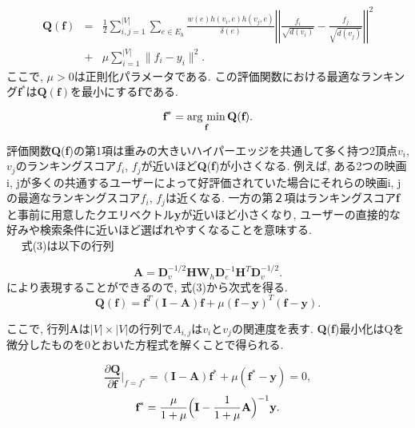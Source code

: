 \documentclass[a4j,11pt]{jarticle}           %
\newcommand{\argmin}{\mathop{\rm arg~min}\limits}
\begin{document}
	\begin{eqnarray}
		\textbf{Q}(\textbf{f})&=&\frac{1}{2}\sum_{i, j=1}^{|V|}\sum_{e\in E_h}\frac{w(e)h(v_i, e)h(v_j, e)}{\delta(e)}\left|\left|\frac{f_i}{\sqrt{d(v_i)}} - \frac{f_j}{\sqrt{d(v_j)}}\right|\right|^2 \nonumber \\ &+& \mu\sum_{i=1}^{|V|}\|f_i-y_i\|^2.
	\end{eqnarray}
	ここで, $\mu>0$は正則化パラメータである. この評価関数における最適なランキング$\textbf{f}^*$は$\textbf{Q}(\textbf{f})$を最小にする\textbf{f}である. 
	
	\begin{equation}
		\textbf{f}^* = \argmin_{\textbf{f}} \textbf{Q}(\textbf{f}). 
	\end{equation}
	
	評価関数\textbf{Q}(\textbf{f})の第1項は重みの大きいハイパーエッジを共通して多く持つ2頂点$v_i$, $v_j$のランキングスコア$f_i$, $f_j$が近いほど\textbf{Q}(\textbf{f})が小さくなる. 
	例えば, ある2つの映画i, jが多くの共通するユーザーによって好評価されていた場合にそれらの映画i, jの最適なランキングスコア$f_i$, $f_j$は近くなる. 
	一方の第２項はランキングスコア\textbf{f}と事前に用意したクエリベクトル\textbf{y}が近いほど小さくなり, ユーザーの直接的な好みや検索条件に近いほど選ばれやすくなることを意味する. 
	\\　 式(3)は以下の行列
	
	\begin{equation}
		\textbf{A}= \textbf{D}_v^{-1/2}\textbf{H}\textbf{W}_h\textbf{D}_e^{-1}\textbf{H}^T\textbf{D}_v^{-1/2}.
	\end{equation}
	により表現することができるので, 式(3)から次式を得る.
	\begin{equation}
		\textbf{Q}(\textbf{f})=\textbf{f}^T(\textbf{I}-\textbf{A})\textbf{f}+\mu(\textbf{f}-\textbf{y})^T(\textbf{f}-\textbf{y}).
	\end{equation}
	
	ここで, 行列\textbf{A}は$|V|\times |V|$の行列で$A_{i, j}$は$v_i$と$v_j$の関連度を表す.  \textbf{Q}(\textbf{f})最小化はQを微分したものを0とおいた方程式を解くことで得られる. 
	
	
	\begin{equation}
		\frac{\partial \textbf{Q}}{\partial \textbf{f}}|_{f=f^*}=(\textbf{I}-\textbf{A})\textbf{f}^*+\mu(\textbf{f}^*-\textbf{y})=0,
	\end{equation}
	\begin{equation}
		\textbf{f}^*=\frac{\mu}{1+\mu}\Bigl(\textbf{I}-\frac{1}{1+\mu}\textbf{A}\Bigr)^{-1}\textbf{y}.
	\end{equation}
	
\end{document}
